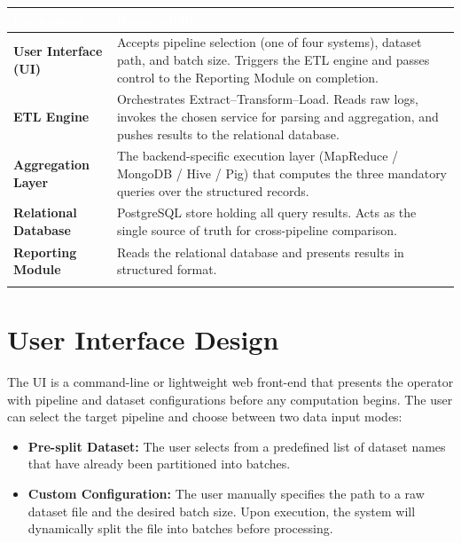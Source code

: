 \documentclass[11pt,a4paper]{article}
\begin{document}
\vspace{4pt}
\begin{center}
\renewcommand{\arraystretch}{1.45}
\begin{tabular}{@{} >{}p{3.6cm} p{10.3cm} @{}}
\arrayrulecolor{PrimaryBlue!30}\toprule
\rowcolor{PrimaryBlue} \textcolor{white}{\textbf{Component}} & \textcolor{white}{\textbf{Responsibility}} \\
\midrule
\rowcolor{RowAlt}\textbf{\color{PrimaryBlue}User Interface (UI)} &
  Accepts pipeline selection (one of four systems), dataset path, and batch size. Triggers the ETL engine and passes control to the Reporting Module on completion. \\[2pt]
\textbf{\color{PrimaryBlue}ETL Engine} &
  Orchestrates Extract--Transform--Load. Reads raw logs, invokes the chosen service for parsing and aggregation, and pushes results to the relational database. \\[2pt]
\rowcolor{RowAlt}\textbf{\color{PrimaryBlue}Aggregation Layer} &
  The backend-specific execution layer (MapReduce / MongoDB / Hive / Pig) that computes the three mandatory queries over the structured records. \\[2pt]
\textbf{\color{PrimaryBlue}Relational Database} &
  PostgreSQL store holding all query results. Acts as the single source of truth for cross-pipeline comparison. \\[2pt]
\rowcolor{RowAlt}\textbf{\color{PrimaryBlue}Reporting Module} &
  Reads the relational database and presents results in structured format. \\
\arrayrulecolor{PrimaryBlue!30}\bottomrule
\end{tabular}
\end{center}

\section{User Interface Design}

The UI is a command-line or lightweight web front-end that presents the operator with pipeline and dataset configurations before any computation begins. The user can select the target pipeline and choose between two data input modes:

\begin{itemize}
  \item \textbf{Pre-split Dataset:} The user selects from a predefined list of dataset names that have already been partitioned into batches.
  \item \textbf{Custom Configuration:} The user manually specifies the path to a raw dataset file and the desired batch size. Upon execution, the system will dynamically split the file into batches before processing.
\end{itemize}
\end{document}
